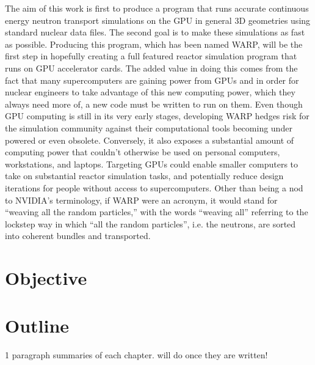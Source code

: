 The aim of this work is first to produce a program that runs accurate continuous energy neutron transport simulations on the GPU in general 3D geometries using standard nuclear data files.  The second goal is to make these simulations as fast as possible.  Producing this program, which has been named WARP, will be the first step in hopefully creating a full featured reactor simulation program that runs on GPU accelerator cards.  The added value in doing this comes from the fact that many supercomputers are gaining power from GPUs and in order for nuclear engineers to take advantage of this new computing power, which they always need more of, a new code must be written to run on them.  Even though GPU computing is still in its very early stages, developing WARP hedges risk for the simulation community against their computational tools becoming under powered or even obsolete.  Conversely, it also exposes a substantial amount of  computing power that couldn't otherwise be used on personal computers, workstations, and laptops.  Targeting GPUs could enable smaller computers to take on substantial reactor simulation tasks, and potentially reduce design iterations for people without access to supercomputers.  Other than being a nod to NVIDIA's terminology, if WARP were an acronym, it would stand for ``weaving all the random particles,'' with the words ``weaving all'' referring to the lockstep way in which ``all the random particles'', i.e. the neutrons, are sorted into coherent bundles and transported.

\section{Objective}


\section{Outline}

1 paragraph summaries of each chapter.  will do once they are written!
